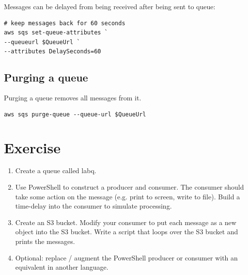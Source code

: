 \documentclass{pgnotes}
\begin{document}
Messages can be delayed from being received after being sent to queue:
\begin{verbatim}
# keep messages back for 60 seconds
aws sqs set-queue-attributes `
--queueurl $QueueUrl `
--attributes DelaySeconds=60
\end{verbatim}

\subsection{Purging a queue}

Purging a queue removes all messages from it.
\begin{verbatim}
aws sqs purge-queue --queue-url $QueueUrl
\end{verbatim}


\section{Exercise}

\begin{enumerate}

\item Create a queue called labq.
  
\item Use PowerShell to construct a producer and consumer.
  The consumer should take some action on the message (e.g. print to screen, write to file).
  Build a time-delay into the consumer to simulate processing.

\item Create an S3 bucket.
  Modify your consumer to put each message as a new object into the S3 bucket.
  Write a script that loops over the S3 bucket and prints the messages.
  
\item
  Optional: replace / augment the PowerShell producer or consumer with an equivalent in another language.

\end{enumerate}
\end{document}
